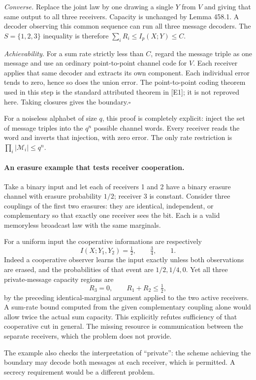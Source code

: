 \documentclass[11pt]{article}
\begin{document}
\emph{Converse.} Replace the joint law by one drawing a single $Y$
from $V$ and giving that same output to all three receivers. Capacity
is unchanged by Lemma 458.1. A decoder observing this common sequence
can run all three message decoders. The $S=\{1,2,3\}$ inequality is
therefore $\sum_iR_i\le I_p(X;Y)\le C$.

\emph{Achievability.} For a sum rate strictly less than $C$, regard the
message triple as one message and use an ordinary point-to-point channel
code for $V$. Each receiver applies that same decoder and extracts its
own component. Each individual error tends to zero, hence so does the
union error. The point-to-point coding theorem used in this step is the
standard attributed theorem in [E1]; it is not reproved here. Taking
closures gives the boundary.\hfill$\square$

For a noiseless alphabet of size $q$, this proof is completely explicit:
inject the set of message triples into the $q^n$ possible channel words.
Every receiver reads the word and inverts that injection, with zero error.
The only rate restriction is $\prod_i|\mathcal M_i|\le q^n$.

\paragraph{An erasure example that tests receiver cooperation.}
Take a binary input and let each of receivers 1 and 2 have a binary
erasure channel with erasure probability $1/2$; receiver 3 is constant.
Consider three couplings of the first two erasures: they are identical,
independent, or complementary so that exactly one receiver sees the bit.
Each is a valid memoryless broadcast law with the same marginals.

For a uniform input the cooperative informations are respectively
\[
 I(X;Y_1,Y_2)=\tfrac12,\qquad\tfrac34,\qquad1.
\]
Indeed a cooperative observer learns the input exactly unless both
observations are erased, and the probabilities of that event are
$1/2,1/4,0$. Yet all three private-message capacity regions are
\[
 R_3=0,\qquad R_1+R_2\le\tfrac12,
\]
by the preceding identical-marginal argument applied to the two active
receivers. A sum-rate bound computed from the given complementary
coupling alone would allow twice the actual sum capacity. This explicitly
refutes sufficiency of that cooperative cut in general. The missing
resource is communication between the separate receivers, which the
problem does not provide.

The example also checks the interpretation of ``private'': the scheme
achieving the boundary may decode both messages at each receiver, which
is permitted. A secrecy requirement would be a different problem.
\end{document}
